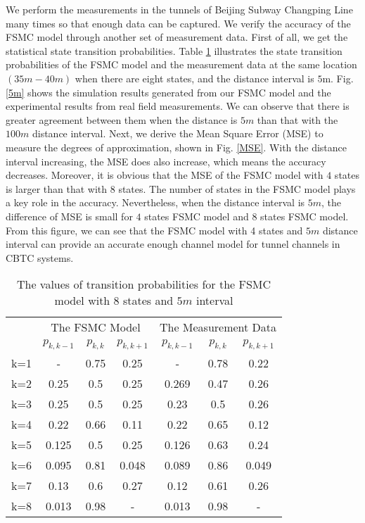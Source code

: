 \documentclass[conference]{IEEEtran}
\begin{document}
We perform the measurements in the  tunnels of Beijing Subway Changping Line many times so that enough data can be captured. We verify the accuracy of the FSMC model through another set of measurement data. First of all, we get the statistical state transition probabilities. Table \ref{STPM_8} illustrates the state transition probabilities of the FSMC model and the measurement data at the same location $(35m-40m)$ when there are eight states, and the distance interval is $5$m. Fig. \ref{5m} shows the simulation results generated from our FSMC model and the experimental results from real field measurements. We can observe that there is greater agreement between them when the distance is $5m$ than that with the $100m$ distance interval. Next, we derive the Mean Square Error (MSE) to measure the degrees of approximation, shown in Fig. \ref{MSE}. With the distance interval increasing, the MSE does also increase, which means the accuracy decreases. Moreover, it is obvious that the MSE of the FSMC model with $4$ states is larger than that with $8$ states. The number of states in the FSMC model plays a key role in the accuracy. Nevertheless, when the distance interval is $5m$, the difference of MSE is small for $4$ states FSMC model and $8$ states FSMC model. From this figure, we can see that the FSMC model with 4 states and $5m$ distance interval can provide an accurate enough channel model for tunnel channels in CBTC systems.

\begin{table}[tp]


\caption{The values of transition probabilities for the FSMC model with $8$ states and $5m$ interval}
\label{STPM_8}
\begin{tabular}{|c|c|c|c|c|c|c|}
\hline
   &\multicolumn{3}{c}{The FSMC Model}\vline&\multicolumn{3}{c}{The Measurement Data}\vline\\ \cline{2-7}
   &$p_{k,k-1}$&$p_{k,k}$&$p_{k,k+1}$&$p_{k,k-1}$&$p_{k,k}$&$p_{k,k+1}$\\ \hline
k=1&-&0.75&0.25&-&0.78&0.22	\\\hline
k=2&0.25&0.5&0.25&0.269&0.47&0.26\\ \hline
k=3&0.25&0.5&0.25&0.23&0.5&0.26\\\hline
k=4&0.22&0.66&0.11&0.22&0.65&0.12\\\hline
k=5&0.125&0.5&0.25&0.126&0.63&0.24\\\hline
k=6&0.095&0.81&0.048&0.089&0.86&0.049\\\hline
k=7&0.13&0.6&0.27&0.12&0.61&0.26\\\hline
k=8&0.013&0.98&-&0.013&0.98&-\\\hline
\end{tabular}
\end{table}
\end{document}
